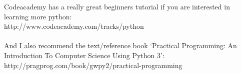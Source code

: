\documentclass{article}
\begin{document}
\noindent
Codeacademy has a really great beginners tutorial if you are interested in learning more python:\\

http://www.codeacademy.com/tracks/python\\
\\
\noindent
And I also recommend the text/reference book `Practical Programming: An Introduction To Computer Science Using Python 3':\\

http://pragprog.com/book/gwpy2/practical-programming
\end{document}
